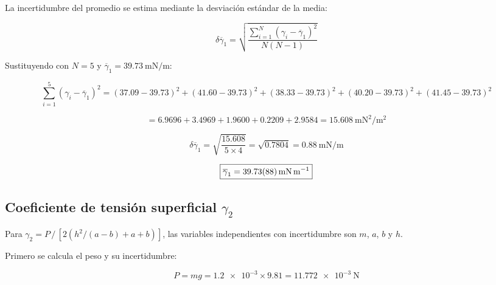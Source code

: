 \begin{appendices}
La incertidumbre del promedio se estima mediante la desviación estándar
de la media:

\begin{equation}
    \delta\overline{\gamma}_1
    = \sqrt{\frac{\displaystyle\sum_{i=1}^{N}(\gamma_i - \overline{\gamma}_1)^2}
                 {N(N-1)}}
\end{equation}

Sustituyendo con $N = 5$ y
$\overline{\gamma}_1 = \qty{39.73}{\milli\newton\per\meter}$:

\begin{equation*}
    \sum_{i=1}^{5}(\gamma_i - \overline{\gamma}_1)^2
    = (\num{37.09}-\num{39.73})^2 + (\num{41.60}-\num{39.73})^2 + (\num{38.33}-\num{39.73})^2
      + (\num{40.20}-\num{39.73})^2 + (\num{41.45}-\num{39.73})^2
\end{equation*}

\begin{equation*}
    = \num{6.9696} + \num{3.4969} + \num{1.9600} + \num{0.2209} + \num{2.9584}
    = \qty{15.608}{\milli\newton\squared\per\meter\squared}
\end{equation*}

\begin{equation*}
    \delta\overline{\gamma}_1
    = \sqrt{\frac{\num{15.608}}{5 \times 4}}
    = \sqrt{\num{0.7804}}
    = \qty{0.88}{\milli\newton\per\meter}
\end{equation*}

\begin{equation*}
    \boxed{\overline{\gamma}_1 = \qty{39.73 \pm 0.88}{\milli\newton\per\meter}}
\end{equation*}

\subsection{Coeficiente de tensión superficial \texorpdfstring{$\gamma_2$}{gamma\_2}}

Para $\gamma_2 = P\,/\,[2(h^2/(a-b)+a+b)]$, las variables
independientes con incertidumbre son $m$, $a$, $b$ y $h$.

Primero se calcula el peso y su incertidumbre:

\begin{equation*}
    P = mg = \num{1.2e-3} \times \num{9.81} = \qty{11.772e-3}{\newton}
\end{equation*}


\end{appendices}
